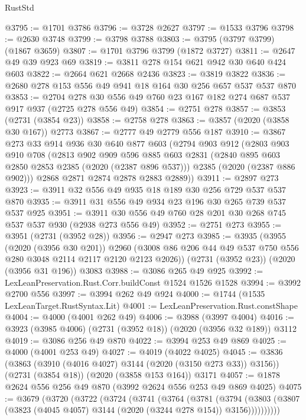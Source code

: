 \begin{lexlean}{RustStd}
\begin{coremodule}
@3795 := @1701 @3786
@3796 := @3728 @2627
@3797 := @1533 @3796
@3798 := @2630 @3748
@3799 := @3798 @3788
@3803 := @3795 (@3797 @3799) (@1867 @3659)
@3807 := @1701 @3796 @3799 (@1872 @3727)
@3811 := @2647 @49 @39 @923 @69
@3819 := @3811 @278 @154 @621 @942 @30 @640 @424 @603
@3822 := @2664 @621 @2668 @2436
@3823 := @3819 @3822
@3836 := @2680 @278 @153 @556 @49 @941 @18 @164 @30 @256 @657 @537 @537 @870
@3853 := @2704 @278 @30 @556 @49 @760 @23 @167 @182 @274 @687 @537 @917 @937 (@2725 @278 @556 @49)
@3854 := @2751 @278
@3857 := @3853 (@2731 (@3854 @23))
@3858 := @2758 @278
@3863 := @3857 (@2020 (@3858 @30 @167)) @2773
@3867 := @2777 @49 @2779 @556 @187
@3910 := @3867
    @273
    @33
    @914
    @936
    @30
    @640
    @877
    @603
    (@2794
      @903
      @912
      (@2803
        @903
        @910
        @708
        (@2813
          @902
          @909
          @596
          @885
          @603
          @2831
          (@2840 @895 @603 @2850 @2853 @2385 (@2020 (@2387 @896 @537)))
          @2385
          (@2020 (@2387 @886 @902)))
        @2868
        @2871
        @2874
        @2878
        @2883
        @2889))
@3911 := @2897 @273
@3923 := @3911 @32 @556 @49 @935 @18 @189 @30 @256 @729 @537 @537 @870
@3935 := @3911 @31 @556 @49 @934 @23 @196 @30 @265 @739 @537 @537 @925
@3951 := @3911 @30 @556 @49 @760 @28 @201 @30 @268 @745 @537 @537 @930 (@2938 @273 @556 @49)
@3952 := @2751 @273
@3955 := @3951 (@2731 (@3952 @28))
@3956 := @2947 @273
@3985 := @3935
    (@3955
      (@2020 (@3956 @30 @201))
      @2960
      (@3008 @86 @206 @44 @49 @537 @750 @556 @280 @3048 @2114 @2117 @2120 @2123 @2026))
    (@2731 (@3952 @23))
    (@2020 (@3956 @31 @196))
    @3083
@3988 := @3086 @265 @49 @925
@3992 := LexLeanPreservation.Rust.Corr.buildConst @1524 @1526 @1528
@3994 := @3992 @2700 @556
@3997 := @3994 @262 @49 @924
@4000 := @1744 (@1535 LexLeanTarget.RustSyntax.Lit)
@4001 := LexLeanPreservation.Rust.constShape
@4004 := @4000 (@4001 @262 @49)
@4006 := @3988 (@3997 @4004)
@4016 := @3923 (@3985 @4006) (@2731 (@3952 @18)) (@2020 (@3956 @32 @189)) @3112
@4019 := @3086 @256 @49 @870
@4022 := @3994 @253 @49 @869
@4025 := @4000 (@4001 @253 @49)
@4027 := @4019 (@4022 @4025)
@4045 := @3836
    (@3863 (@3910 (@4016 @4027) @3144 (@2020 (@3150 @273 @33)) @3156))
    (@2731 (@3854 @18))
    (@2020 (@3858 @153 @164))
    @3171
@4057 := @1878 @2624 @556 @256 @49 @870 (@3992 @2624 @556 @253 @49 @869 @4025)
@4075 := @3679
    (@3720
      (@3722
        (@3724
          (@3741
            (@3764
              (@3781
                (@3794
                  (@3803 (@3807 (@3823 (@4045 @4057) @3144 (@2020 (@3244 @278 @154)) @3156))))))))))

\end{coremodule}
\end{lexlean}
